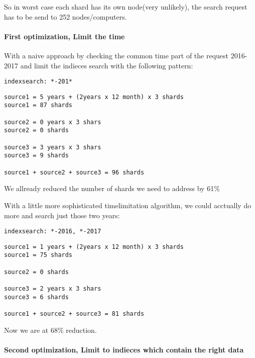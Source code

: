 So in worst case each shard has its own node(very unlikely), the search
request has to be send to 252 nodes/computers.

\paragraph{First optimization, Limit the
time}\label{first-optimization-limit-the-time}

With a naive approach by checking the common time part of the request
2016-2017 and limit the indieces search with the following pattern:

\begin{verbatim}
indexsearch: *-201*
\end{verbatim}

\begin{verbatim}
source1 = 5 years + (2years x 12 month) x 3 shards
source1 = 87 shards

source2 = 0 years x 3 shars
source2 = 0 shards

source3 = 3 years x 3 shars
source3 = 9 shards

source1 + source2 + source3 = 96 shards
\end{verbatim}

We allready reduced the number of shards we need to address by 61\%

With a little more sophisticated timelimitation algorithm, we could
acctually do more and search just those two years:

\begin{verbatim}
indexsearch: *-2016, *-2017
\end{verbatim}

\begin{verbatim}
source1 = 1 years + (2years x 12 month) x 3 shards
source1 = 75 shards

source2 = 0 shards

source3 = 2 years x 3 shars
source3 = 6 shards

source1 + source2 + source3 = 81 shards
\end{verbatim}

Now we are at 68\% reduction.

\paragraph{Second optimization, Limit to indieces which contain the
right
data}\label{second-optimization-limit-to-indieces-which-contain-the-right-data}

